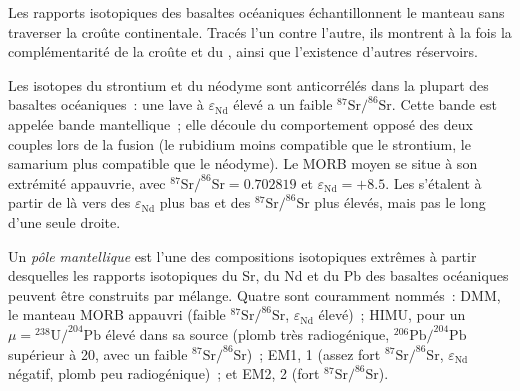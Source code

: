 Les rapports isotopiques des basaltes océaniques échantillonnent le manteau sans traverser
la croûte continentale. Tracés l'un contre l'autre, ils montrent à la fois la
complémentarité de la croûte et du , ainsi que l'existence d'autres
réservoirs.

Les isotopes du strontium et du néodyme sont anticorrélés dans la plupart des basaltes
océaniques~: une lave à $\varepsilon_{\mathrm{Nd}}$ élevé a un faible
$^{87}\mathrm{Sr}/^{86}\mathrm{Sr}$. Cette bande est appelée bande mantellique~; elle découle du
comportement opposé des deux couples lors de la fusion (le rubidium moins
compatible que le strontium, le samarium plus compatible que le néodyme). Le MORB moyen
se situe à son extrémité appauvrie, avec $^{87}\mathrm{Sr}/^{86}\mathrm{Sr} = 0.702819$ et
$\varepsilon_{\mathrm{Nd}} = +8.5$. Les  s'étalent à partir de là vers
des $\varepsilon_{\mathrm{Nd}}$ plus bas et des $^{87}\mathrm{Sr}/^{86}\mathrm{Sr}$ plus élevés, mais pas
le long d'une seule droite.

\begin{definition}\label{def:b2:isotope-geochemistry:end-members}
Un \emph{pôle mantellique} est l'une des compositions isotopiques extrêmes
à partir desquelles les rapports isotopiques du Sr, du Nd et du Pb des basaltes océaniques peuvent être
construits par mélange. Quatre sont couramment nommés~: DMM, le manteau MORB
appauvri (faible $^{87}\mathrm{Sr}/^{86}\mathrm{Sr}$, $\varepsilon_{\mathrm{Nd}}$ élevé)~;
HIMU, pour un $\mu = {}^{238}\mathrm{U}/^{204}\mathrm{Pb}$ élevé dans sa source
(plomb très radiogénique, $^{206}\mathrm{Pb}/^{204}\mathrm{Pb}$ supérieur à 20, avec un faible
$^{87}\mathrm{Sr}/^{86}\mathrm{Sr}$)~; EM1,  1 (assez fort
$^{87}\mathrm{Sr}/^{86}\mathrm{Sr}$, $\varepsilon_{\mathrm{Nd}}$ négatif, plomb
peu radiogénique)~; et EM2,  2 (fort $^{87}\mathrm{Sr}/^{86}\mathrm{Sr}$).
\end{definition}

